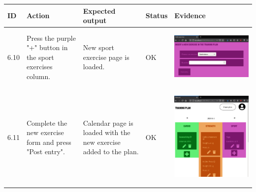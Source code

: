\documentclass[12pt,twoside,titlepage,a4paper]{article}
\theoremstyle{definicion}
\theoremstyle{lema}
\theoremstyle{teorema}
\theoremstyle{corolario}
\theoremstyle{ejemplo}
\theoremstyle{nota}
\begin{document}
\begin{table}[!h]
	\centering
	\begin{tabular}{|m{0.6cm}|m{2.9cm}|m{3.6cm}|m{1.1cm}|m{5.9cm}|}
		\hline
		\textbf{ID} & \textbf{Action} & \textbf{Expected output} & \textbf{Status} & \textbf{Evidence} \\ 
		\hline
		6.10 & Press the purple "+" button in the sport exercises column. & New sport exercise page is loaded. & OK &
		\begin{center}\includegraphics[scale=0.22]{newsport.png}\end{center} \\
		\hline
		6.11 & Complete the new exercise form and press "Post entry". & Calendar page is loaded with the new exercise
		added to the plan. & OK &
		\begin{center}\includegraphics[scale=0.22]{calendar5.png}\end{center} \\

\end{tabular}
\end{table}
\end{document}
